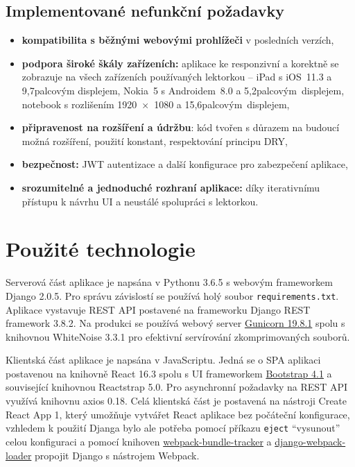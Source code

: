 \subsection{Implementované nefunkční požadavky}
\begin{itemize}
    \item \textbf{kompatibilita s běžnými webovými prohlížeči} v posledních verzích,
    \item \textbf{podpora široké škály zařízeních:} aplikace ke responzivní a korektně se zobrazuje na všech zařízeních používaných lektorkou -- iPad s iOS~11.3 a 9,7palcovým displejem, Nokia~5 s Androidem~8.0 a 5,2palcovým~displejem, notebook s rozlišením 1920~×~1080 a 15,6palcovým~displejem,
    \item \textbf{připravenost na rozšíření a údržbu}: kód tvořen s důrazem na budoucí možná rozšíření, použití konstant, respektování principu DRY,
    \item \textbf{bezpečnost:} JWT autentizace a další konfigurace pro zabezpečení aplikace,
    \item \textbf{srozumitelné a jednoduché rozhraní aplikace:} díky iterativnímu přístupu k návrhu UI a neustálé spolupráci s lektorkou.
\end{itemize}

\section{Použité technologie}
Serverová část aplikace je napsána v Pythonu 3.6.5 s webovým frameworkem Django 2.0.5. Pro správu závislostí se používá holý soubor \verb|requirements.txt|. Aplikace vystavuje REST API postavené na frameworku Django REST framework 3.8.2. Na produkci se používá webový server \href{http://gunicorn.org/}{Gunicorn 19.8.1} spolu s knihovnou WhiteNoise 3.3.1 pro efektivní servírování zkomprimovaných souborů.

Klientská část aplikace je napsána v JavaScriptu. Jedná se o SPA aplikaci postavenou na knihovně React 16.3 spolu s UI frameworkem \href{https://getbootstrap.com}{Bootstrap 4.1} a související knihovnou Reactstrap 5.0. Pro asynchronní požadavky na REST API využívá knihovnu axios 0.18. Celá klientská část je postavená na nástroji Create React App 1, který umožňuje \cite{cra} vytvářet React aplikace bez počáteční konfigurace, vzhledem k použití Djanga bylo ale potřeba \cite{bp} pomocí příkazu \verb|eject| \enquote{vysunout} celou konfiguraci a pomocí knihoven \href{https://github.com/owais/webpack-bundle-tracker}{webpack-bundle-tracker} a  \href{https://github.com/owais/django-webpack-loader}{django-webpack-loader} propojit Django s nástrojem Webpack.

